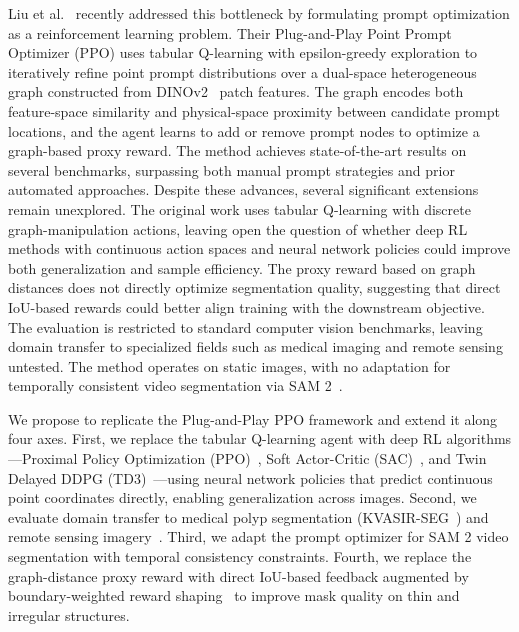 \documentclass[journal, onecolumn]{IEEEtran}
\begin{document}
Liu et al.~\cite{Liu2025PlugAndPlayPPO} recently addressed this bottleneck by formulating prompt optimization as a reinforcement learning problem. Their Plug-and-Play Point Prompt Optimizer (PPO) uses tabular Q-learning with epsilon-greedy exploration to iteratively refine point prompt distributions over a dual-space heterogeneous graph constructed from DINOv2~\cite{Oquab2024DINOv2} patch features. The graph encodes both feature-space similarity and physical-space proximity between candidate prompt locations, and the agent learns to add or remove prompt nodes to optimize a graph-based proxy reward. The method achieves state-of-the-art results on several benchmarks, surpassing both manual prompt strategies and prior automated approaches. Despite these advances, several significant extensions remain unexplored. The original work uses tabular Q-learning with discrete graph-manipulation actions, leaving open the question of whether deep RL methods with continuous action spaces and neural network policies could improve both generalization and sample efficiency. The proxy reward based on graph distances does not directly optimize segmentation quality, suggesting that direct IoU-based rewards could better align training with the downstream objective. The evaluation is restricted to standard computer vision benchmarks, leaving domain transfer to specialized fields such as medical imaging and remote sensing untested. The method operates on static images, with no adaptation for temporally consistent video segmentation via SAM 2~\cite{Ravi2024SAM2}.

We propose to replicate the Plug-and-Play PPO framework and extend it along four axes. First, we replace the tabular Q-learning agent with deep RL algorithms---Proximal Policy Optimization (PPO)~\cite{Schulman2017PPO}, Soft Actor-Critic (SAC)~\cite{Haarnoja2018SAC}, and Twin Delayed DDPG (TD3)~\cite{Fujimoto2018TD3}---using neural network policies that predict continuous point coordinates directly, enabling generalization across images. Second, we evaluate domain transfer to medical polyp segmentation (KVASIR-SEG~\cite{Jha2020KvasirSEG}) and remote sensing imagery~\cite{Osco2023SAMRemoteSensing}. Third, we adapt the prompt optimizer for SAM 2 video segmentation with temporal consistency constraints. Fourth, we replace the graph-distance proxy reward with direct IoU-based feedback augmented by boundary-weighted reward shaping~\cite{Ng1999RewardShaping} to improve mask quality on thin and irregular structures.
\end{document}
